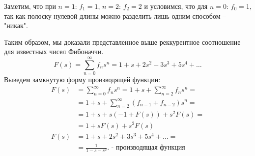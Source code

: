 \documentclass[a0paper,portrait]{baposter}
\begin{document}
\begin{poster}
{{\bigskip
Заметим, что при $n = 1$: $f_1 = 1$, $n = 2$: $f_2 = 2$ и 
условимся, что для $n = 0$: $f_0 = 1$,
так как полоску нулевой длины можно разделить лишь одним способом – "никак".

Таким образом, мы доказали представленное выше реккурентное соотношение для известных чисел Фибоначчи.
\[
	F(s) = \sum_{n=0}^{\infty} f_ns^n = 1 + s + 2s^2 + 3s^3 + 5s^4 + \ldots
\]
Выведем замкнутую форму производящей функции:
\begin{align*}
	F(s) &= \sum_{n=0}^{\infty} f_ns^n = 1 + s + \sum_{n=2}^{\infty} f_ns^n = \\
	&= 1 + s + \sum_{n=2}^{\infty} (f_{n - 1} + f_{n - 2})s^n = \\ 
		 &=
		 1 + s + s\left(-1 + F(s)\right) + s^2F(s) = \\
		 &=
		 1 + sF(s) + s^2F(s) \\
	F(s) &= 1 + s + 2s^2 + 3s^3 + 5s^4 + \ldots = \\
	     &= 
	     \frac{1}{1 - s - s^2}.\text{ - производящая функция}
\end{align*}
}
}
\end{poster}
\end{document}
